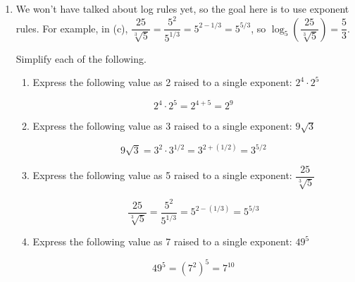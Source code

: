 \documentclass{article}
\begin{document}
\begin{enumerate}
\item 

  \begin{workshop}
    We won't have talked about log rules yet, so the goal here is to use exponent rules. For example, in (c), $\dfrac{25}{\sqrt[3]{5}} = \dfrac{5^2}{5^{1/3}} = 5^{2 - 1/3} = 5^{5/3}$, so $\log_5 \left( \dfrac{25}{\sqrt[3]{5}} \right) = \dfrac{5}{3}$.
  \end{workshop}

  Simplify each of the following.

  \begin{enumerate}
  \item
    \begin{problem}[\vfill]
      Express the following value as 2 raised to a single exponent: $2^4 \cdot 2^5 $
    \end{problem}

    \begin{solution}
        $$2^4 \cdot 2^5 = 2^{4+5}=2^9$$
    \end{solution}

  \item
    \begin{problem}[\vfill]
      Express the following value as 3 raised to a single exponent: $ 9 \sqrt{3} $
    \end{problem}

    \begin{solution}
        $$9 \sqrt{3} = 3^2 \cdot 3^{1/2} = 3^{2+(1/2)} = 3^{5/2}$$
    \end{solution}

  \item
    \begin{problem}[\vfill]
      Express the following value as 5 raised to a single exponent: $\dfrac{25}{\sqrt[3]{5}}$
    \end{problem}

    \begin{solution}
        $$\dfrac{25}{\sqrt[3]{5}} = \dfrac{5^2}{5^{1/3}} = 5^{2-(1/3)} = 5^{5/3} $$
    \end{solution}

  \item
    \begin{problem}[\vfill\newpage]
      Express the following value as 7 raised to a single exponent: $ 49^5$
    \end{problem}

    \begin{solution}
        $$49^5 = (7^2)^5 = 7^{10}$$
    \end{solution}


\end{enumerate}
\end{enumerate}
\end{document}
